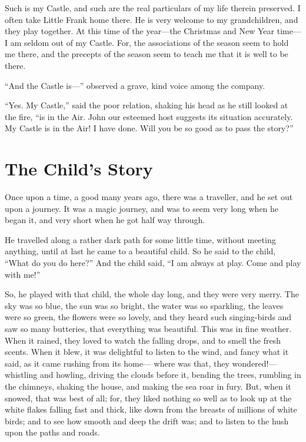 Such is my Castle, and such are the real particulars of my life
therein preserved.  I often take Little Frank home there.  He is
very welcome to my grandchildren, and they play together.  At this
time of the year---the Christmas and New Year time---I am seldom out
of my Castle.  For, the associations of the season seem to hold me
there, and the precepts of the season seem to teach me that it is
well to be there.


``And the Castle is---'' observed a grave, kind voice among the
company.

``Yes.  My Castle,'' said the poor relation, shaking his head as he
still looked at the fire, ``is in the Air.  John our esteemed host
suggests its situation accurately.  My Castle is in the Air!  I have
done.  Will you be so good as to pass the story?''



\chapter{The Child's Story}



Once upon a time, a good many years ago, there was a traveller, and
he set out upon a journey.  It was a magic journey, and was to seem
very long when he began it, and very short when he got half way
through.

He travelled along a rather dark path for some little time, without
meeting anything, until at last he came to a beautiful child.  So he
said to the child, ``What do you do here?''  And the child said, ``I am
always at play.  Come and play with me!''

So, he played with that child, the whole day long, and they were
very merry.  The sky was so blue, the sun was so bright, the water
was so sparkling, the leaves were so green, the flowers were so
lovely, and they heard such singing-birds and saw so many butteries,
that everything was beautiful.  This was in fine weather.  When it
rained, they loved to watch the falling drops, and to smell the
fresh scents.  When it blew, it was delightful to listen to the
wind, and fancy what it said, as it came rushing from its home---%
where was that, they wondered!---whistling and howling, driving the
clouds before it, bending the trees, rumbling in the chimneys,
shaking the house, and making the sea roar in fury.  But, when it
snowed, that was best of all; for, they liked nothing so well as to
look up at the white flakes falling fast and thick, like down from
the breasts of millions of white birds; and to see how smooth and
deep the drift was; and to listen to the hush upon the paths and
roads.


